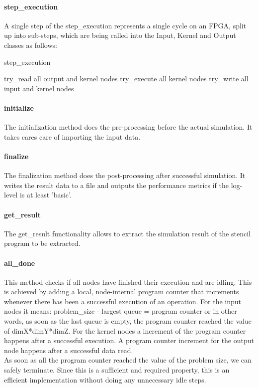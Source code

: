 \paragraph{step\_execution}
A single step of the step\_execution represents a single cycle on an FPGA, split up into sub-steps, which are being called into the Input, Kernel and Output classes as follows:
\begin{algorithm}
	\caption{step\_execution}
	\begin{algorithmic}
		\STATE try\_read all output and kernel nodes
		\STATE try\_execute all kernel nodes
		\STATE try\_write all input and kernel nodes
	\end{algorithmic}
\end{algorithm}

\paragraph{initialize}
The initialization method does the pre-processing before the actual simulation. It takes cares care of importing the input data.


\paragraph{finalize}
The finalization method does the post-processing after successful simulation. It writes the result data to a file and outputs the performance metrics if the log-level is at least 'basic'.


\paragraph{get\_result}
The get\_result functionality allows to extract the simulation result of the stencil program to be extracted.


\paragraph{all\_done}
This method checks if all nodes have finished their execution and are idling. This is achieved by adding a local, node-internal program counter that increments whenever there has been a successful execution of an operation. For the input nodes it means: problem\_size - largest queue = program counter or in other words, as soon as the last queue is empty, the program counter reached the value of dimX*dimY*dimZ. For the kernel nodes a increment of the program counter happens after a successful execution. A program counter increment for the output node happens after a successful data read. \\
As soon as all the program counter reached the value of the problem size, we can safely terminate. Since this is a sufficient and required property, this is an efficient implementation without doing any unnecessary idle steps.


